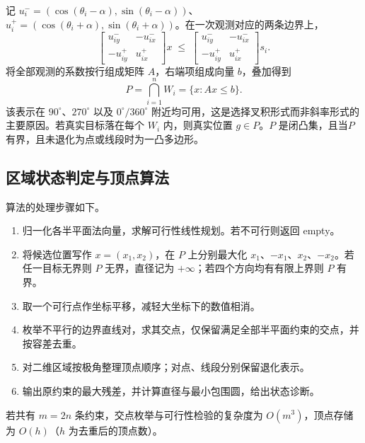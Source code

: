 \documentclass[UTF8,a4paper,zihao=-4,fontset=none]{ctexart}
\begin{document}
记 \(u_i^-=(\cos(\theta_i-\alpha),\sin(\theta_i-\alpha))\)、\(u_i^+=(\cos(\theta_i+\alpha),\sin(\theta_i+\alpha))\)。在一次观测对应的两条边界上，
\begin{equation}
  \begin{bmatrix}u_{iy}^- & -u_{ix}^-\\[2pt] -u_{iy}^+ & u_{ix}^+\end{bmatrix}x
  \;\le\;
  \begin{bmatrix}u_{iy}^- & -u_{ix}^-\\[2pt] -u_{iy}^+ & u_{ix}^+\end{bmatrix}s_i .
  \label{eq:halfplane}
\end{equation}
将全部观测的系数按行组成矩阵 \(A\)，右端项组成向量 \(b\)，叠加得到
\begin{equation}
  P=\bigcap_{i=1}^{n}W_i=\{x:Ax\le b\}.
  \label{eq:P}
\end{equation}
该表示在 \(90^\circ\)、\(270^\circ\) 以及 \(0^\circ/360^\circ\) 附近均可用，这是选择叉积形式而非斜率形式的主要原因。若真实目标落在每个 \(W_i\) 内，则真实位置 \(g\in P\)。\(P\) 是闭凸集，且当\(P\)有界，且未退化为点或线段时为一凸多边形。

\subsection{区域状态判定与顶点算法}

算法的处理步骤如下。

\begin{enumerate}[label=(\arabic*),leftmargin=2.2em]
  \item 归一化各半平面法向量，求解可行性线性规划。若不可行则返回 empty。
  \item 将候选位置写作 \(x=(x_1,x_2)\)，在 \(P\) 上分别最大化 \(x_1\)、\(-x_1\)、\(x_2\)、\(-x_2\)。若任一目标无界则 \(P\) 无界，直径记为 \(+\infty\)；若四个方向均有有限上界则 \(P\) 有界。
  \item 取一个可行点作坐标平移，减轻大坐标下的数值相消。
  \item 枚举不平行的边界直线对，求其交点，仅保留满足全部半平面约束的交点，并按容差去重。
  \item 对二维区域按极角整理顶点顺序；对点、线段分别保留退化表示。
  \item 输出原约束的最大残差，并计算直径与最小包围圆，给出状态诊断。
\end{enumerate}

若共有 \(m=2n\) 条约束，交点枚举与可行性检验的复杂度为 \(O(m^3)\)，顶点存储为 \(O(h)\)（\(h\) 为去重后的顶点数）。
\end{document}
